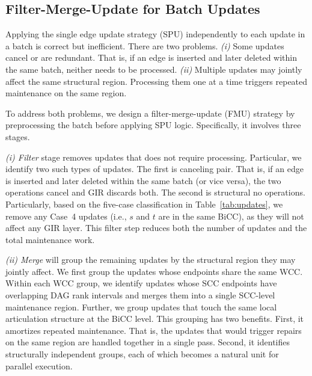 
\subsection{Filter-Merge-Update for Batch Updates}

Applying the single edge update strategy (SPU) independently to each update in a batch is correct but inefficient.
There are two problems.
\textit{(i)} Some updates cancel or are redundant. That is, if an edge is inserted and later deleted within the same batch, neither needs to be processed.
\textit{(ii)} Multiple updates may jointly affect the same structural region.
Processing them one at a time triggers repeated maintenance on the same region.

To address both problems, 
we design a filter-merge-update (FMU) strategy by preprocessing the batch before applying SPU logic. Specifically, it involves three stages.

\textit{(i) Filter} stage removes updates that does not require processing.
Particular, we identify two such types of updates.
The first is canceling pair. 
That is, if an edge is inserted and later deleted within the same batch (or vice versa), the two operations cancel and GIR discards both.
The second is structural no operations.
Particularly, based on the five-case classification
in Table~\ref{tab:updates}, we remove any Case~4 updates (i.e., $s$ and $t$ are in the same BiCC), as they will not affect any GIR layer.
This filter step reduces both the number of updates and the total maintenance work.

\textit{(ii) Merge}
will group the remaining updates by the structural region they may jointly affect.
We first group the updates whose endpoints share the same WCC.
Within each WCC group, we identify updates whose SCC endpoints have overlapping DAG rank intervals and merges them into a single SCC-level maintenance region.
Further, we group updates that touch the same local articulation structure at the BiCC level.
This grouping has two benefits.
First, it amortizes repeated maintenance. That is, the updates that would trigger repairs on the same region are handled together in a single pass.
Second, it identifies structurally independent groups, each of which becomes a natural unit for parallel execution.

